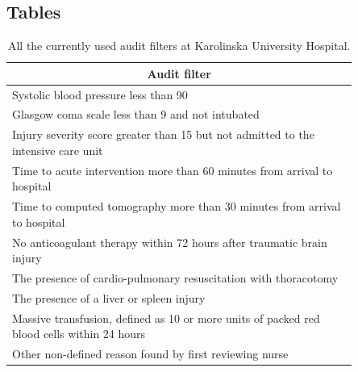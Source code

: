 \documentclass[12pt, letterpaper]{article}
\begin{document}
\begin{appendices}
    \setcounter{table}{0}
    \renewcommand{\thetable}{A\arabic{table}}

    \setcounter{figure}{0}
    \renewcommand{\thefigure}{A\arabic{figure}}

    \setcounter{secnumdepth}{1}

    \section{Tables}
    \begin{table}[h]
        \centering
        \renewcommand{\arraystretch}{1.2}

        \caption{All the currently used audit filters at Karolinska University Hospital.}
        \label{tab:auditfilters}

        \begin{tabular}{@{}|p{0.85\linewidth}|@{}}
            \hline
            \multicolumn{1}{|c|}{\textbf{Audit filter}}                                                \\\hline
            Systolic blood pressure less than 90                                                       \\\hline
            Glasgow coma scale less than 9 and not intubated                                           \\\hline
            Injury severity score greater than 15 but not admitted to the intensive care unit          \\\hline
            Time to acute intervention more than 60 minutes from arrival to hospital                   \\\hline
            Time to computed tomography more than 30 minutes from arrival to hospital                  \\\hline
            No anticoagulant therapy within 72 hours after traumatic brain injury                      \\\hline
            The presence of cardio-pulmonary resuscitation with thoracotomy                            \\\hline
            The presence of a liver or spleen injury                                                   \\\hline
            Massive transfusion, defined as 10 or more units of packed red blood cells within 24 hours \\\hline
            Other non-defined reason found by first reviewing nurse                                    \\\hline
        \end{tabular}
    \end{table}



\end{appendices}
\end{document}
